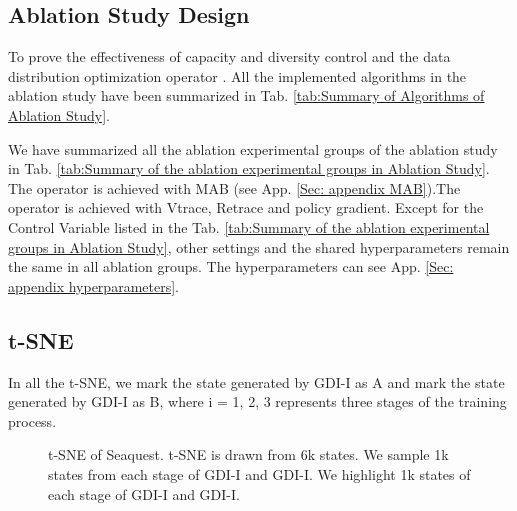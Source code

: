 \documentclass[nohyperref]{article}
\theoremstyle{plain}
\begin{document}
\subsection{Ablation Study Design}
\label{app: Ablation Study Design}

To prove the effectiveness of capacity and diversity control and the data distribution optimization operator . All the implemented algorithms in the ablation study have been summarized in Tab. \ref{tab:Summary of Algorithms of Ablation Study}. 


 We have summarized all the ablation experimental groups of the ablation study in Tab. \ref{tab:Summary of the ablation experimental groups in Ablation Study}. The operator  is achieved with MAB (see App. \ref{Sec: appendix MAB}).The operator  is achieved with Vtrace, Retrace and policy gradient. Except for the Control Variable listed in the Tab. \ref{tab:Summary of the ablation experimental groups in Ablation Study}, other settings and the shared hyperparameters remain the same in all ablation  groups. The hyperparameters can see App. \ref{Sec: appendix hyperparameters}.

\subsection{t-SNE}
\label{app: tsne}
In all the t-SNE, we mark the state generated by GDI-I as A and mark the state generated by GDI-I as B, where i = 1, 2, 3 represents three stages of the training process.

\setcounter{subfigure}{0}
\begin{figure}[!ht]
	\begin{center}
	
	
	\end{center}
	\caption{t-SNE of Seaquest. 
t-SNE is drawn from 6k states.
	We sample 1k states from each stage of GDI-I and GDI-I.
	We highlight 1k states of each stage of GDI-I and GDI-I.}
	\label{Fig: t-SNE of Seaquest}
\end{figure}
\end{document}
